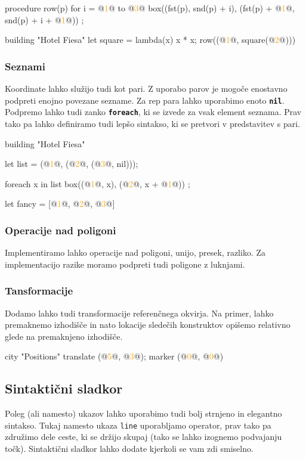 \documentclass{article}
\newcommand\Num[1]{\textcolor{orange}{#1}}
\newcommand\Keyword[1]{{\textbf{\texttt{#1}}}}
\newcommand\Fun[1]{{\texttt{#1}}}
\begin{document}
\begin{CITY}
  procedure row(p) {
    for i = @\Num{1}@ to @\Num{3}@ {
      box((fst(p), snd(p) + i), (fst(p) + @\Num{1}@, snd(p) + i + @\Num{1}@))
    }
  };

  building "Hotel Fiesa" {
    let square = lambda(x) {x * x};
    row((@\Num{1}@, square(@\Num{2}@)))
  }
\end{CITY}

\subsubsection{Seznami}
Koordinate lahko služijo tudi kot pari.
Z uporabo parov je mogoče enostavno podpreti enojno povezane sezname.
Za rep para lahko uporabimo enoto \Keyword{nil}.
Podpremo lahko tudi zanko \Keyword{foreach}, ki se izvede za vsak element seznama.
Prav tako pa lahko definiramo tudi lepšo sintakso, ki se pretvori v predstavitev s pari.

\begin{CITY}
  building "Hotel Fiesa" {
    let list = (@\Num{1}@, (@\Num{2}@, (@\Num{3}@, nil)));

    foreach x in list {
      box((@\Num{1}@, x), (@\Num{2}@, x + @\Num{1}@))
    };

    let fancy = [@\Num{1}@, @\Num{2}@, @\Num{3}@]
  }
\end{CITY}

\subsubsection{Operacije nad poligoni}
Implementiramo lahko operacije nad poligoni, unijo, presek, razliko.
Za implementacijo razike moramo podpreti tudi poligone z luknjami.

\subsubsection{Tansformacije}
Dodamo lahko tudi transformacije referenčnega okvirja.
Na primer, lahko premaknemo izhodišče in nato lokacije sledečih konstruktov opišemo relativno glede na premaknjeno izhodišče.

\begin{CITY}
  city "Positions" {
    translate (@\Num{5}@, @\Num{3}@);
    marker (@\Num{0}@, @\Num{0}@)
  }
\end{CITY}

\subsection{Sintaktični sladkor}
Poleg (ali namesto) ukazov lahko uporabimo tudi bolj strnjeno in elegantno sintakso.
Tukaj namesto ukaza \Fun{line} uporabljamo operator, prav tako pa združimo dele ceste, ki se držijo skupaj (tako se lahko izognemo podvajanju točk).
Sintaktični sladkor lahko dodate kjerkoli se vam zdi smiselno.
\end{document}
